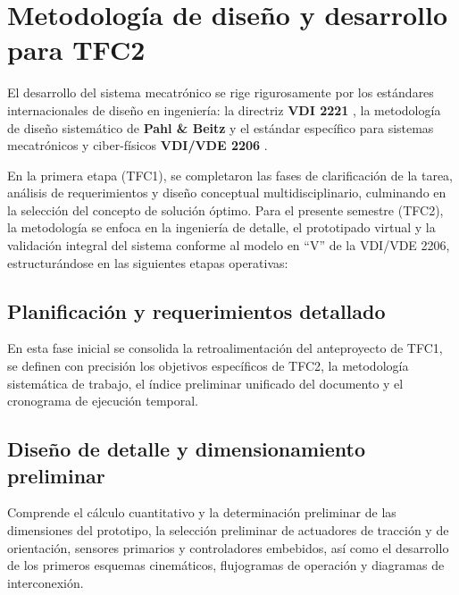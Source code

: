 \documentclass[../../General.tex]{subfiles}
\begin{document}
\section{Metodología de diseño y desarrollo para TFC2} 

El desarrollo del sistema mecatrónico se rige rigurosamente por los estándares internacionales de diseño en ingeniería: la directriz \textbf{VDI 2221} \citep{VDI2221_2019}, la metodología de diseño sistemático de \textbf{Pahl \& Beitz} \citep{Pahl2007} y el estándar específico para sistemas mecatrónicos y ciber-físicos \textbf{VDI/VDE 2206} \citep{VDI2206_2021}. 

En la primera etapa (TFC1), se completaron las fases de clarificación de la tarea, análisis de requerimientos y diseño conceptual multidisciplinario, culminando en la selección del concepto de solución óptimo. Para el presente semestre (TFC2), la metodología se enfoca en la ingeniería de detalle, el prototipado virtual y la validación integral del sistema conforme al modelo en ``V'' de la VDI/VDE 2206, estructurándose en las siguientes etapas operativas:

\subsection{Planificación y requerimientos detallado}
En esta fase inicial se consolida la retroalimentación del anteproyecto de TFC1, se definen con precisión los objetivos específicos de TFC2, la metodología sistemática de trabajo, el índice preliminar unificado del documento y el cronograma de ejecución temporal.

\subsection{Diseño de detalle y dimensionamiento preliminar}
Comprende el cálculo cuantitativo y la determinación preliminar de las dimensiones del prototipo, la selección preliminar de actuadores de tracción y de orientación, sensores primarios y controladores embebidos, así como el desarrollo de los primeros esquemas cinemáticos, flujogramas de operación y diagramas de interconexión.
\end{document}
